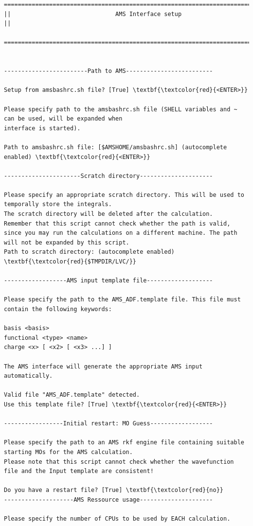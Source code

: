 \documentclass[a4paper,11pt,DIV=15,openany]{scrbook}
\begin{document}
\begin{oframed}
\begin{Verbatim}[commandchars=\\\{\}]
================================================================================
||                              AMS Interface setup                               ||
  ================================================================================


------------------------Path to AMS-------------------------

Setup from amsbashrc.sh file? [True] \textbf{\textcolor{red}{<ENTER>}}

Please specify path to the amsbashrc.sh file (SHELL variables and ~ can be used, will be expanded when 
interface is started).

Path to amsbashrc.sh file: [$AMSHOME/amsbashrc.sh] (autocomplete enabled) \textbf{\textcolor{red}{<ENTER>}}

----------------------Scratch directory---------------------

Please specify an appropriate scratch directory. This will be used to temporally store the integrals. 
The scratch directory will be deleted after the calculation. 
Remember that this script cannot check whether the path is valid, 
since you may run the calculations on a different machine. The path will not be expanded by this script.
Path to scratch directory: (autocomplete enabled) \textbf{\textcolor{red}{$TMPDIR/LVC/}}

------------------AMS input template file-------------------

Please specify the path to the AMS_ADF.template file. This file must contain the following keywords:

basis <basis>
functional <type> <name>
charge <x> [ <x2> [ <x3> ...] ]

The AMS interface will generate the appropriate AMS input automatically.

Valid file "AMS_ADF.template" detected. 
Use this template file? [True] \textbf{\textcolor{red}{<ENTER>}}

-----------------Initial restart: MO Guess------------------

Please specify the path to an AMS rkf engine file containing suitable starting MOs for the AMS calculation. 
Please note that this script cannot check whether the wavefunction file and the Input template are consistent!

Do you have a restart file? [True] \textbf{\textcolor{red}{no}}
--------------------AMS Ressource usage---------------------

Please specify the number of CPUs to be used by EACH calculation.


\end{Verbatim}
\end{oframed}
\end{document}
